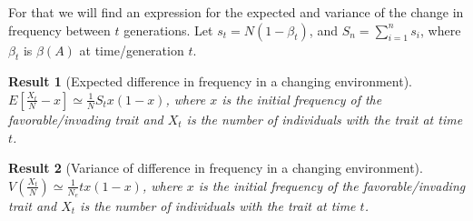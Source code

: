 \documentclass[12pt]{extarticle}
\newtheorem{result}{Result}
\begin{document}
For that we will find an expression for the expected and variance of the change in frequency between $t$ generations.
Let $s_t=N(1-\beta_t)$, and $S_n=\sum\limits_{i=1}^n s_i$, where $\beta_t$ is $\beta(A)$ at time/generation $t$.

\begin{result} [Expected difference in frequency in a changing environment]\label{res:ch_expected}
$E[\frac{X_t}{N}-x]\simeq \frac{1}{N}S_tx(1-x)$, where $x$ is the initial frequency of the favorable/invading trait and $X_t$ is the number of individuals with the trait at time $t$.
\end{result}
\begin{result}[Variance of difference in frequency in a changing environment]\label{res:ch_var}
$V(\frac{X_t}{N})\simeq\frac{1}{N_e}tx(1-x)$, where $x$ is the initial frequency of the favorable/invading trait and $X_t$ is the number of individuals with the trait at time $t$.
\end{result}
\end{document}
